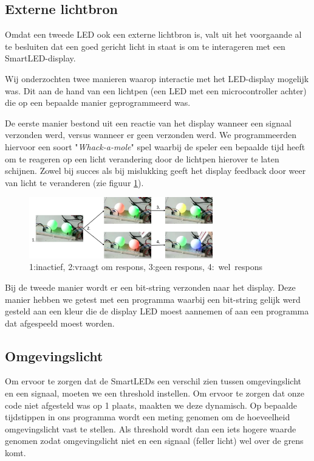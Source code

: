 \documentclass{article}
\begin{document}
\subsection{Externe lichtbron}
Omdat een tweede LED ook een externe lichtbron is, valt uit het voorgaande al te besluiten dat een goed gericht licht in staat is om te interageren met een SmartLED-display. 

Wij onderzochten twee manieren waarop interactie met het LED-display mogelijk was. Dit aan de hand van een lichtpen (een LED met een microcontroller achter) die op een bepaalde manier geprogrammeerd was.

De eerste manier bestond uit een reactie van het display wanneer een signaal verzonden werd, versus wanneer er geen verzonden werd. We programmeerden hiervoor een soort "\textit{Whack-a-mole}" spel waarbij de speler een bepaalde tijd heeft om te reageren op een licht verandering door de lichtpen hierover te laten schijnen. Zowel bij succes als bij mislukking geeft het display feedback door weer van licht te veranderen (zie figuur \ref{fig:mole}).
\begin{figure}
\centering
\includegraphics[width=8cm]{moleSequence.png}
\caption{1:inactief, 2:vraagt om respons, 3:geen respons, \mbox{4: wel respons}}
\label{fig:mole}
\end{figure}

Bij de tweede manier wordt er een bit-string verzonden naar het display. Deze manier hebben we getest met een programma waarbij een bit-string gelijk werd gesteld aan een kleur die de display LED moest aannemen of aan een programma dat afgespeeld moest worden.

\subsection{Omgevingslicht}
Om ervoor te zorgen dat de SmartLEDs een verschil zien tussen omgevingslicht en een signaal, moeten we een threshold instellen. Om ervoor te zorgen dat onze code niet afgesteld was op 1 plaats, maakten we deze dynamisch. Op bepaalde tijdstippen in ons programma wordt een meting genomen om de hoeveelheid omgevingslicht vast te stellen. Als threshold wordt dan een iets hogere waarde genomen zodat omgevingslicht niet en een signaal (feller licht) wel over de grens komt.
\end{document}
